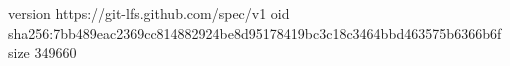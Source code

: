 version https://git-lfs.github.com/spec/v1
oid sha256:7bb489eac2369cc814882924be8d95178419bc3c18c3464bbd463575b6366b6f
size 349660
